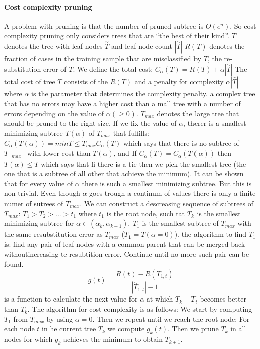 \documentclass[12pt,landscape]{extarticle}
\begin{document}
\begin{multicols}{3}
\paragraph{Cost complexity pruning}
A problem with pruning is that the number of pruned subtree is $O(e^n)$.
So cost complexity pruning only considers trees that are
``the best of their kind''.
$T$ denotes the tree with leaf nodes $\overset{\sim}{T}$  and leaf node count
$|\overset{\sim}{T}|$
$R(T)$ denotes the fraction of cases in the training sample that are
misclassified by $T$, the re-substitution error of $T$.
We define the total cost: $C_\alpha(T)=R(T)+\alpha |\overset{\sim}{T}|$
The total cost of tree $T$ consists of the $R(T)$ and a penalty for complexity
$\alpha|\overset{\sim}{T}|$ where $\alpha$ is the parameter that determines the
complexity penalty.
a complex tree that has no errors may have a higher cost than a mall tree with
a number of errors depending on the value of $\alpha (\geq 0)$.
$T_{max}$ denotes the large tree that should be pruned to the right size.
If we fix the value of $\alpha$, therer is a smallest minimizing subtree $T(\alpha)$
of $T_{max}$ that fulfills:
$C_\alpha(T(\alpha))=min T \leq T_{max} C_\alpha(T)$ which says that there is no
subtree of $T_[max]$ with lower cost than $T(\alpha)$, and
If $C_\alpha (T) = C_\alpha(T(\alpha))$ then $T(\alpha) \leq T$ which says that
fi there is a tie then we pick the smallest tree (the one that is a subtree of
all other that achieve the minimum).
It can be shown that for every value of $\alpha$ there is  such a smallest
minimizing subtree. But this is non trivial.
Even though $\alpha$ goes trough a continum of values there is only a finite
numer of sutrees of $T_{max}$. We can construct a descreasing sequence of
subtrees of $T_{max}$: $T_1 > T_2 > ... > {t_1} $ where $t_1$ is the root node,
such tat $T_k$ is the smallest minimizing subtree for
$\alpha \in (\alpha_k, \alpha_{k+1})$. $T_1$ is the smallest subtree of $T_{max}$
with the same resubstitution error as $T_{max}$ ($T_1=T(\alpha=0)$).
the algorithm to find $T_1$ is: find any pair of leaf nodes with a common parent
that can be merged back withoutincreasing te resubtition error. Continue until
no more such pair can be found.
\[g(t)=\frac{R(t)-R(T_{1,t})}{|\overset{\sim}{T}_{1,t}|-1}\]
is a function to calculate the next value for $\alpha$ at which $T_k - T_t$
becomes better than $T_k$.
The algorithm for cost complexity is as follows: We start by computing $T_1$ from $T_{max}$
by using $\alpha = 0$. Then we repeat until we reach the root node:
For each node $t$ in he current tree $T_k$ we compute $g_k(t)$. Then we prune
$T_k$ in all nodes for which $g_k$ achieves the minimum to obtain $T_{k+1}$.

\end{multicols}
\end{document}
